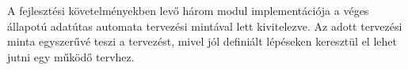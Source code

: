 \tab A fejlesztési követelményekben levő három modul implementációja a véges állapotú adatútas automata\cite{brassai2018ukda_auto} tervezési mintával lett kivitelezve.
Az adott tervezési minta egyszerűvé teszi a tervezést, mivel jól definiált lépéseken keresztül el lehet jutni egy működő tervhez.
